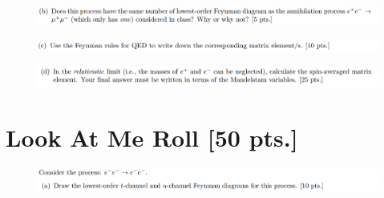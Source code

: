 \documentclass[11pt]{article}
\theoremstyle{definition}
\numberwithin{equation}{section}
\begin{document}
\newpage



\begin{figure}[H]
    \centering
    \includegraphics[scale = 0.4]{1b.png}
\end{figure}


\newpage



\begin{figure}[H]
    \centering
    \includegraphics[scale = 0.4]{1c.png}
\end{figure}


\newpage


\begin{figure}[H]
    \centering
    \includegraphics[scale = 0.4]{1d.png}
\end{figure}


\newpage


\section{\textbf{Look At Me Roll} [50 pts.]}


\begin{figure}[H]
    \centering
    \includegraphics[scale = 0.4]{2a.png}
\end{figure}
\end{document}

